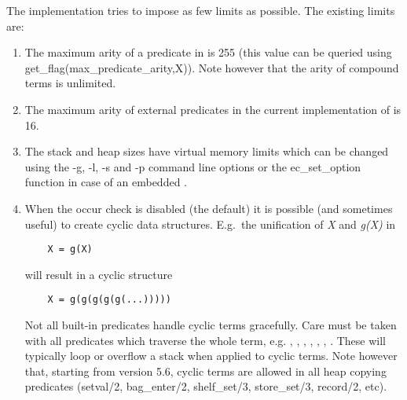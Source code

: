 The {\eclipse} implementation tries to impose as few limits as possible.
The existing limits are:
\begin{enumerate}
\item The maximum arity of a predicate in {\eclipse} is 255
(this value can be queried using get_flag(max_predicate_arity,X)).
Note however that the arity of compound terms is unlimited.

\item The maximum arity of external predicates in the current implementation
of {\eclipse} is 16.

\item The stack and heap sizes have virtual memory limits which can be
changed using the -g, -l, -s and -p command line options or the
ec_set_option function in case of an embedded {\eclipse}.

\item {}When the occur check is disabled (the default)
it is possible (and sometimes useful) to create cyclic data structures.
E.g.\ the unification of {\it X} and {\it g(X)} in
\begin{verbatim}
    X = g(X)
\end{verbatim}
will result in a cyclic structure
\begin{verbatim}
    X = g(g(g(g(g(...)))))
\end{verbatim}
Not all {\eclipse} built-in predicates handle cyclic terms gracefully.
Care must be taken with all predicates which traverse the whole term, e.g.
,
,
,
,
,
,
.
These will typically loop or overflow a stack when applied to cyclic terms.
Note however that, starting from version 5.6, cyclic terms are allowed in all
heap copying predicates (setval/2, bag_enter/2, shelf_set/3, store_set/3,
record/2, etc).

\end{enumerate}
